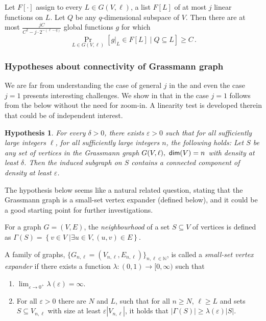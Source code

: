 \documentclass{toc}
\newtheorem{conj}[theorem]{Hypothesis}
\newcommand\sett[2]{\left\{ \left. #1 \;\right\vert #2 \right\}}
\newcommand\Prob[2]{{\Pr_{#1}\left[ {#2} \right]}}
\newcommand\eps{\varepsilon}
\renewcommand\geq{\geqslant}
\begin{document}
\begin{theorem}\label{thm:list_dec_upper} Let $F[\cdot]$ assign to every $L \in G(V,\ell)$, a list $F[L]$ of
at most $j$ linear functions on $L$.  Let $Q$ be any $q$-dimensional subspace of $V$.
Then there are at most $\frac{jC}{C^2-j\cdot 2^{-(\ell-q)}}$ global functions $g$ for which
\[
\Prob{L\in G(V,\ell)}{g|_L\in F[L] \mid Q \subseteq L}\geqslant C\,.%
\]
\end{theorem}





%
\subsubsection{Hypotheses about connectivity of Grassmann graph}

We are far from understanding the case of general $j$ in the
 and even the case $j=1$
presents interesting challenges. We show in  that
 in the case $j=1$ follows from the
 below without the need for zoom-in.
A linearity test is developed therein that could be of independent interest.

\begin{conj}\label{conj:gras_expand}
For every %
$\delta >0$,  there exists %
%
$\eps > 0$
  such that
  for all sufficiently large integers $\ell$, for all sufficiently large integers $n$,
 the following holds:
 Let $S$ be any set
of vertices in the Grassmann graph $G(V,\ell), ~{\sf dim}(V)=n$ with density at least $\delta$. Then the
induced subgraph on $S$ contains a connected component of density at least $\eps$.
\end{conj}

%
%
%
%
The hypothesis below  seems
like a natural related question, stating that the Grassmann graph is a
small-set vertex expander (defined below), and it could be a good starting point
for further investigations.
%
\begin{definition}
For a graph $G = (V,E)$, the \emph{neighbourhood} of a set %
%
$S\subseteq V$   %
of vertices  %
is defined as
  $\Gamma(S) = \sett{v\in V}{\exists u\in V, (u,v)\in E}$.
\end{definition}
\begin{definition} %
\label{def:small-set}  %
A family of graphs, $\{G_{n,\ell} = (V_{n,\ell},E_{n,\ell})\}_{n,\ell\in\mathbb{N}}$,
%
%
is called a \emph{small-set vertex expander} if there %
exists a function $\lambda\colon (0,1)\to [0,\infty)$ such that
\begin{enumerate}
  \item $\lim_{\eps\rightarrow 0^{+}}\lambda(\eps)=\infty$.
  \item For all $\eps>0$ there are $N$ and $L$, such that for all $n\geq N$, $\ell\geq L$
and sets $S\subseteq V_{n,\ell}$ with size at least $\eps|V_{n,\ell}|$,
  it holds that $|\Gamma(S)|\geq \lambda(\eps)|S|$.
\end{enumerate}
\end{definition}
\end{document}
